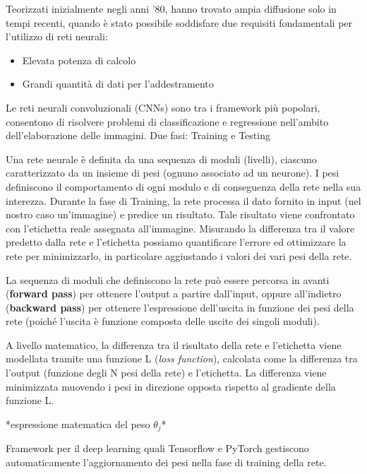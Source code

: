 \documentclass[a4paper,oneside]{book}
\begin{document}
    Teorizzati inizialmente negli anni '80, hanno trovato
    ampia diffusione solo in tempi recenti, quando è stato
    possibile soddisfare due requisiti fondamentali per l'utilizzo
    di reti neurali:
    \begin{itemize}
        \item Elevata potenza di calcolo
        \item Grandi quantità di dati per l'addestramento 
    \end{itemize}

    Le reti neurali convoluzionali (CNNs) sono tra i framework più popolari, 
    consentono di risolvere problemi di classificazione e regressione nell'ambito dell'elaborazione delle immagini.
    Due fasi: Training e Testing

    Una rete neurale è definita da una sequenza di moduli
    (livelli), ciascuno caratterizzato da un insieme di pesi (ognuno associato ad un neurone). 
    I pesi definiscono il comportamento di ogni modulo e di conseguenza della rete nella sua interezza. 
    Durante la fase di Training, la rete processa il dato fornito in input (nel nostro caso un'immagine)
    e predice un risultato. Tale risultato viene confrontato con l'etichetta reale assegnata all'immagine. 
    Misurando la differenza tra il valore predetto dalla rete e l'etichetta possiamo quantificare l'errore 
    ed ottimizzare la rete per minimizzarlo, in particolare aggiustando i valori dei vari pesi della rete.

    La sequenza di moduli che definiscono la rete può essere percorsa
    in avanti (\textbf{forward pass}) per ottenere l'output a partire dall'input,
    oppure all'indietro (\textbf{backward pass}) per ottenere l'espressione
    dell'uscita in funzione dei pesi della rete (poiché l'uscita è funzione composta
    delle uscite dei singoli moduli).

    A livello matematico, la differenza tra il risultato della rete e l'etichetta viene modellata tramite una funzione L 
    (\textit{loss function}), calcolata come la differenza tra l'output (funzione degli N pesi della rete) e l'etichetta. 
    La differenza viene minimizzata muovendo i pesi in direzione opposta rispetto al gradiente della funzione L.

    *espressione matematica del peso $\theta_j$*

    Framework per il deep learning quali Tensorflow e PyTorch gestiscono automaticamente 
    l'aggiornamento dei pesi nella fase di training della rete.
\end{document}
